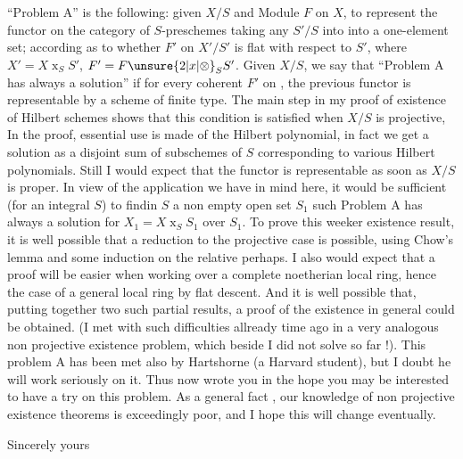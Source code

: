 ``Problem A'' is the following: given $X/S$ and  Module $F$ on $X$, to represent the functor on the category of $S$-preschemes taking any $S'/S$ into  into a one-element  set; according as to whether $F'$ on $X'/S'$ is flat with respect to $S'$, where $X'=X\mathbin{x}_S S'$, $F'=F\unsure{2|x|\otimes}_S S'$. Given $X/S$, we say that ``Problem A  has always a solution'' if for every coherent $F'$ on , the previous functor  is representable by a scheme of finite type. The main step in my proof of existence of Hilbert schemes shows that this condition is satisfied when $X/S$ is projective,
In the proof, essential use is made of the Hilbert polynomial, in fact we get a solution as a disjoint sum of subschemes of $S$ corresponding to various Hilbert polynomials. Still I would expect that the  functor is representable as soon as $X/S$ is proper. In view of the application we have in mind here, it would be sufficient (for an integral $S$) to findin $S$ a non empty  open set $S_1$ such Problem A has always a solution for $X_1=X\mathbin{x}_S S_1$ over $S_1$. To prove this weeker existence result, it is well possible that a reduction to the projective case is possible, using Chow's lemma and some induction on the relative  perhaps. I also would expect that a proof will be easier when working over a complete noetherian local ring, hence the case of a general  local ring by flat descent. And it is well possible that, putting together two such partial results, a proof of the existence in general could be obtained. (I met with such difficulties allready time ago in a very analogous non projective existence problem, which beside I did not solve so far !). This problem A has been met also by Hartshorne (a Harvard student), but I doubt he will work seriously on it. Thus  now wrote you in the hope you may be interested to have a try on this problem. As a general fact , our knowledge of non projective existence theorems is exceedingly poor, and I hope this will change eventually.

Sincerely yours\\
\\
